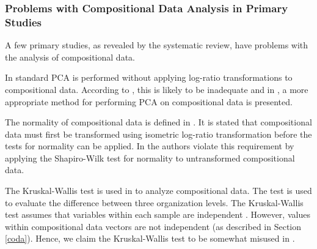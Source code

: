 \subsubsection{\label{codaProblems}Problems with Compositional Data Analysis in Primary Studies}

A few primary studies, as revealed by the systematic review, have problems with the analysis of compositional data.

In \cite{Pettersson2008,Wohlin2006} standard PCA is performed without applying log-ratio transformations to compositional data. According to \cite{Aitchison1983}, this is likely to be inadequate and in \cite{Filzmoser2007}, a more appropriate method for performing PCA on compositional data is presented.

The normality of compositional data is defined in \cite{PawlowskyGlahn2007}. It is stated that compositional data must first be transformed using isometric log-ratio transformation before the tests for normality can be applied. In \cite{Jonsson2005a} the authors violate this requirement by applying the Shapiro-Wilk test for normality to untransformed compositional data.

The Kruskal-Wallis test is used in \cite{Jonsson2005a} to analyze compositional data. The test is used to evaluate the difference between three organization levels. The Kruskal-Wallis test assumes that variables within each sample are independent \cite{Kruskal1952a}. However, values within compositional data vectors are not independent (as described in Section \ref{coda}). Hence, we claim the Kruskal-Wallis test to be somewhat misused in \cite{Jonsson2005a}.